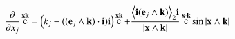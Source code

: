 \documentclass{article}      %
\newcommand{\dxj}[2] {\frac {\partial {#1}} {\partial {x_{#2}}}}
\newcommand{\dsqxj}[2] {\frac {\partial^2 {#1}} {\partial {x_{#2}}^2}}
\DeclareMathOperator{\Exp}{e}
\newcommand{\gpgrade}[2] {{\left\langle{{#1}}\right\rangle}_{#2}}
\newcommand{\gpgradetwo}[1] {\gpgrade{#1}{2}}
\begin{document}
\begin{equation}
\dxj{}{j}\Exp^{\Bx\Bk}
= 
\left(k_j - ((\Be_j \wedge \Bk) \cdot \Bi) \Bi \right) \Exp^{\Bx\Bk} + 
\frac{\gpgradetwo{\Bi (\Be_j \wedge \Bk)} \Bi}{\abs{\Bx \wedge \Bk}} 
\Exp^{\Bx \cdot \Bk} \sin{\abs{\Bx \wedge \Bk}}
\end{equation}




%




%
\end{document}
